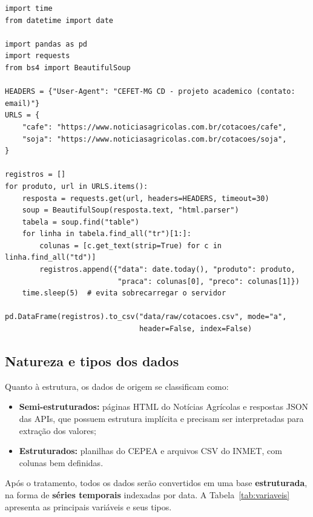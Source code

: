 \documentclass{article}
\begin{document}
\begin{lstlisting}[style=pythonstyle, caption={Esboço do crawler de cotações.}, label={lst:crawler}]
import time
from datetime import date

import pandas as pd
import requests
from bs4 import BeautifulSoup

HEADERS = {"User-Agent": "CEFET-MG CD - projeto academico (contato: email)"}
URLS = {
    "cafe": "https://www.noticiasagricolas.com.br/cotacoes/cafe",
    "soja": "https://www.noticiasagricolas.com.br/cotacoes/soja",
}

registros = []
for produto, url in URLS.items():
    resposta = requests.get(url, headers=HEADERS, timeout=30)
    soup = BeautifulSoup(resposta.text, "html.parser")
    tabela = soup.find("table")
    for linha in tabela.find_all("tr")[1:]:
        colunas = [c.get_text(strip=True) for c in linha.find_all("td")]
        registros.append({"data": date.today(), "produto": produto,
                          "praca": colunas[0], "preco": colunas[1]})
    time.sleep(5)  # evita sobrecarregar o servidor

pd.DataFrame(registros).to_csv("data/raw/cotacoes.csv", mode="a",
                               header=False, index=False)
\end{lstlisting}

\subsection{Natureza e tipos dos dados}

Quanto à estrutura, os dados de origem se classificam como:

\begin{itemize}
      \item \textbf{Semi-estruturados:} páginas HTML do Notícias Agrícolas e respostas JSON das APIs, que
            possuem estrutura implícita e precisam ser interpretadas para extração dos valores;
      \item \textbf{Estruturados:} planilhas do CEPEA e arquivos CSV do INMET, com colunas bem definidas.
\end{itemize}

Após o tratamento, todos os dados serão convertidos em uma base \textbf{estruturada}, na forma de
\textbf{séries temporais} indexadas por data. A Tabela~\ref{tab:variaveis} apresenta as principais
variáveis e seus tipos.
\end{document}
